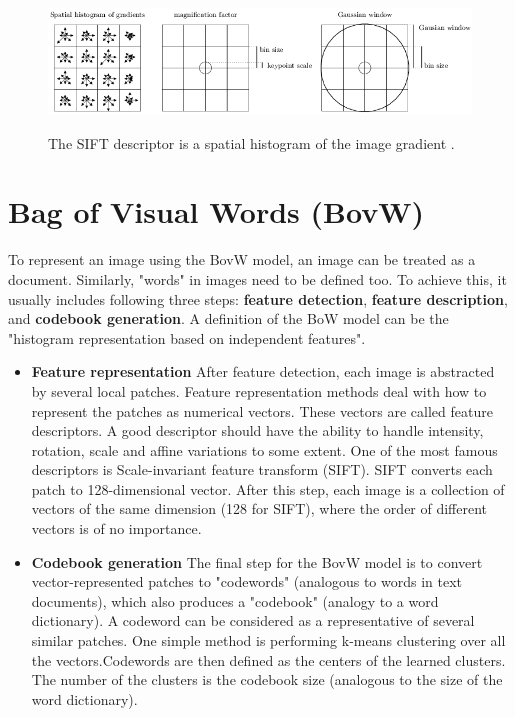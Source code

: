 \documentclass[12pt]{article}
\numberwithin{equation}{section}
\numberwithin{table}{section}
\numberwithin{figure}{section}
\begin{document}
\begin{figure}[H] \centering
	\caption{The SIFT descriptor is a spatial histogram of the image gradient \cite{sift}. }
	\includegraphics[width=1\textwidth]{image6.png}
	\label{figure6}
\end{figure}



\section{Bag of Visual Words (BovW)} \label{bow}

To represent an image using the BovW model, an image can be treated as a document. Similarly, "words" in images need to be defined too. To achieve this, it usually includes following three steps: \textbf{feature detection}, \textbf{feature description}, and \textbf{codebook generation}. A definition of the BoW model can be the "histogram representation based on independent features".

\begin{itemize}

\item \textbf{Feature representation} After feature detection, each image is abstracted by several local patches. Feature representation methods deal with how to represent the patches as numerical vectors. These vectors are called feature descriptors. A good descriptor should have the ability to handle intensity, rotation, scale and affine variations to some extent. One of the most famous descriptors is Scale-invariant feature transform (SIFT). SIFT converts each patch to 128-dimensional vector. After this step, each image is a collection of vectors of the same dimension (128 for SIFT), where the order of different vectors is of no importance.

\item \textbf{Codebook generation} The final step for the BovW model is to convert vector-represented patches to "codewords" (analogous to words in text documents), which also produces a "codebook" (analogy to a word dictionary). A codeword can be considered as a representative of several similar patches. One simple method is performing k-means clustering over all the vectors.Codewords are then defined as the centers of the learned clusters. The number of the clusters is the codebook size (analogous to the size of the word dictionary).

\end{itemize}
\end{document}
